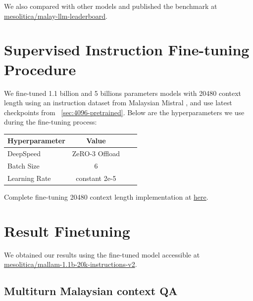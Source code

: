 \documentclass{article}
\begin{document}
We also compared with other models and published the benchmark at \href{https://huggingface.co/spaces/mesolitica/malay-llm-leaderboard}{mesolitica/malay-llm-leaderboard}.

\section{Supervised Instruction Fine-tuning Procedure}

We fine-tuned 1.1 billion and 5 billions parameters models with 20480 context length using an instruction dataset from Malaysian Mistral \cite{zolkepli2024large}, and use latest checkpoints from ~\ref{sec:4096-pretrained}. Below are the hyperparameters we use during the fine-tuning process:

\begin{table}[h]
  \centering
  \begin{tabular}{lccl}
    \hline
    \textbf{Hyperparameter} & \textbf{Value} \\
    \hline
    DeepSpeed               & ZeRO-3 Offload \\
    Batch Size              & 6              \\
    Learning Rate           & constant 2e-5  \\

    \hline
  \end{tabular}
\end{table}

Complete fine-tuning 20480 context length implementation at \href{https://github.com/mesolitica/malaya/tree/5.1/session/mistral#mallam-11b}{here}.

\section{Result Finetuning}\label{sec:result-finetuning}

We obtained our results using the fine-tuned model accessible at \href{https://huggingface.co/mesolitica/mallam-1.1b-20k-instructions-v2}{mesolitica/mallam-1.1b-20k-instructions-v2}.

\subsection{Multiturn Malaysian context QA}
\end{document}
